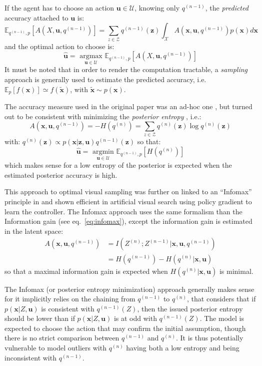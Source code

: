 \documentclass[12pt,twoside,openright]{article}
\begin{document}
If the agent has to choose an action $\boldsymbol{u} \in \mathcal{U}$, knowing only $q^{(n-1)}$, the \emph{predicted} accuracy attached to $\boldsymbol{u}$ is:
$$\mathbb{E}_{q^{(n-1)},p}\left[A(X, \boldsymbol{u}, q^{(n-1)})\right]  = \sum_{z\in\mathcal{Z}} q^{(n-1)}(\boldsymbol{z}) \int_{\mathcal{X}}  A(\boldsymbol{x}, \boldsymbol{u}, q^{(n-1)}) p(\boldsymbol{x}) d\boldsymbol{x} $$  
and the optimal action to choose is:
$$\hat{\boldsymbol{u}} = \underset{\boldsymbol{u} \in \mathcal{U}}{\text{ argmax }} \mathbb{E}_{q^{(n-1)},p}\left[A(X, \boldsymbol{u}, q^{(n-1)})\right] $$ 
It must be noted that in order to render the computation tractable, a \emph{sampling} approach is generally used to estimate the predicted accuracy, i.e. $\mathbb{E}_p[f(\boldsymbol{x})] \simeq f(\tilde{\boldsymbol{x}})$, with $\tilde{\boldsymbol{x}}\sim p(\boldsymbol{x})$.

The accuracy measure used in the original paper was an ad-hoc one \cite{najemnik2005optimal}, but turned out to be consistent with minimizing the \emph{posterior entropy} \cite{najemnik2009simple}, i.e.:
$$A(\boldsymbol{x}, \boldsymbol{u}, q^{(n-1)}) = -H(q^{(n)}) = \sum_{z \in \mathcal{Z}} q^{(n)}(\boldsymbol{z}) \log q^{(n)}(\boldsymbol{z})$$
with: $q^{(n)}(\boldsymbol{z}) \propto p(\boldsymbol{x|\boldsymbol{z}, \boldsymbol{u}})q^{(n-1)}(\boldsymbol{z}) $
so that:
$$\hat{\boldsymbol{u}} = \underset{\boldsymbol{u} \in \mathcal{U}}{\text{ argmin }} \mathbb{E}_{q^{(n-1)},p}\left[H(q^{(n)})\right] $$ 
which makes sense for a low entropy of the posterior is expected when the estimated posterior accuracy is high.

This approach to optimal visual sampling was further on linked to an ``Infomax'' principle in \cite{butko2010infomax} and shown efficient in artificial visual search using policy gradient \cite{williams1992simple} to learn the controller. The Infomax approach uses the same formalism than the Information gain (see eq.~\ref{eq:infomax}), except the information gain is estimated in the latent space:
\begin{align}
A(\boldsymbol{x}, \boldsymbol{u}, q^{(n-1)}) &= I(Z^{(n)}; Z^{(n-1)}|\boldsymbol{x}, \boldsymbol{u}, q^{(n-1)})\nonumber\\
&= H(q^{(n-1)}) - H(q^{(n)}|\boldsymbol{x}, \boldsymbol{u})
\end{align}
so that a maximal information gain is expected when $H(q^{(n)}|\boldsymbol{x}, \boldsymbol{u})$ is minimal.

The Infomax (or posterior entropy minimization) approach generally makes sense for it implicitly relies on the chaining from $q^{(n-1)}$ to $q^{(n)}$, that considers that if $p(\boldsymbol{x}|Z, \boldsymbol{u})$ is consistent with $q^{(n-1)}(Z)$, then the issued posterior entropy should be lower than if $p(\boldsymbol{x}|Z, \boldsymbol{u})$ is at odd with $q^{(n-1)}(Z)$. The model is expected to choose the action that may confirm the initial assumption, though there is no strict comparison between $q^{(n-1)}$ and $q^{(n)}$.
It is thus potentially vulnerable to model outliers with $q^{(n)}$ having both a low entropy and being inconsistent with $q^{(n-1)}$. 
\end{document}
